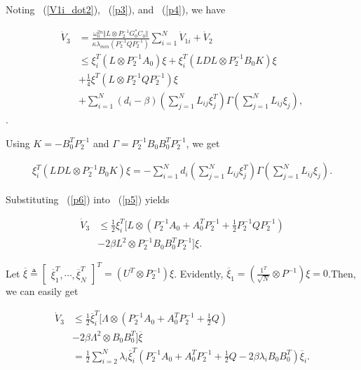 \documentclass[english]{cccconf}
\begin{document}
Noting ~(\ref{V1i_dot2}), ~(\ref{p3}), and ~(\ref{p4}),  we have

\begin{equation}
  \label{p5}
  \begin{aligned}
\dot V_3 &= \frac{\omega^{2n}_0 \Vert L \otimes P^{-1}_{2}G_{0}^{*}C_0 \Vert}{\kappa \lambda_{min}{(P_2^{-1} Q P_2^{-1})}} \sum_{i=1}^N \dot V_{1i} + \dot V_2 \\
& \le \xi^T_i ( L \otimes P^{-1}_{2} A_{0}) \xi + \xi^T_i ( LDL \otimes P^{-1}_{2} B_{0} K) \xi \\
&+\frac{1}{4} \xi^T (L \otimes P_{2}^{-1} Q P_{2}^{-1}) \xi \\
&+\sum_{i=1}^N(d_i-\beta)(\sum_{j=1}^N L_{i j} \xi_{j}^T)\Gamma(\sum_{j=1}^N L_{i j} \xi_{j}), 
  \end{aligned}
\end{equation}.

Using $K=-B_0^T P_2^{-1}$ and $\Gamma = P_2^{-1}B_0 B_0^T P_2^{-1}$, we get

\begin{equation}
  \label{p6}
  \begin{aligned}
  \xi^T_i ( LDL \otimes P^{-1}_{2} B_{0} K) \xi=-\sum_{i=1}^{N}d_i(\sum_{j=1}^N L_{ij} \xi_{j}^T)\Gamma(\sum_{j=1}^N L_{ij} \xi_{j}).  
  \end{aligned}
\end{equation}

Substituting ~(\ref{p6}) into ~(\ref{p5}) yields

\begin{equation}
  \label{p7}
  \begin{aligned}
\dot V_3
&\le \frac{1}{2} \xi^T_i [ L \otimes \left( P^{-1}_{2} A_{0} + A_{0}^T P^{-1}_{2} + \frac{1}{2}P_{2}^{-1} Q P_{2}^{-1} \right)\\ 
&- 2 \beta L^2 \otimes P_2^{-1}B_{0} B_{0}^{T} P_{2}^{-1} ] \xi. 
  \end{aligned}
\end{equation}

Let $\overline \xi \triangleq \begin{bmatrix} \overline \xi_1^T,\cdots, \overline \xi_N^T\end{bmatrix}^T=(U^T \otimes P_2^{-1}) \xi$. Evidently, $\overline \xi_1 = (\frac{1^T}{\sqrt{N}} \otimes P^{-1})\xi = 0$.Then, we can easily get

\begin{equation}
  \label{p8}
  \begin{aligned}
\dot V_3
&\le \frac{1}{2}\overline \xi^T_i [ \Lambda \otimes \left( P^{-1}_{2} A_{0} + A_{0}^T P^{-1}_{2} + \frac{1}{2}Q \right)\\ 
&- 2 \beta \Lambda^2 \otimes B_{0} B_{0}^{T}]\overline \xi \\
&= \frac{1}{2}\sum_{i=2}^{N}\lambda_i \overline \xi_i^T(P^{-1}_{2} A_{0} + A_{0}^T P^{-1}_{2} + \frac{1}{2}Q- 2 \beta \lambda_i B_{0} B_{0}^{T}) \overline \xi_i.  
  \end{aligned}
\end{equation}
\end{document}
